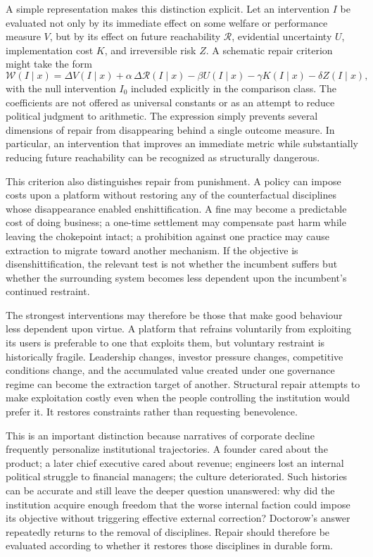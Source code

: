 \documentclass[11pt]{article}
\begin{document}
A simple representation makes this distinction explicit. Let an intervention \(I\) be evaluated not only by its immediate effect on some welfare or performance measure \(V\), but by its effect on future reachability \(\mathcal{R}\), evidential uncertainty \(U\), implementation cost \(K\), and irreversible risk \(Z\). A schematic repair criterion might take the form
\[
\mathcal{W}(I\mid x)
=
\Delta V(I\mid x)
+
\alpha\,\Delta \mathcal{R}(I\mid x)
-
\beta U(I\mid x)
-
\gamma K(I\mid x)
-
\delta Z(I\mid x),
\]
with the null intervention \(I_0\) included explicitly in the comparison class. The coefficients are not offered as universal constants or as an attempt to reduce political judgment to arithmetic. The expression simply prevents several dimensions of repair from disappearing behind a single outcome measure. In particular, an intervention that improves an immediate metric while substantially reducing future reachability can be recognized as structurally dangerous.

This criterion also distinguishes repair from punishment. A policy can impose costs upon a platform without restoring any of the counterfactual disciplines whose disappearance enabled enshittification. A fine may become a predictable cost of doing business; a one-time settlement may compensate past harm while leaving the chokepoint intact; a prohibition against one practice may cause extraction to migrate toward another mechanism. If the objective is disenshittification, the relevant test is not whether the incumbent suffers but whether the surrounding system becomes less dependent upon the incumbent's continued restraint.

The strongest interventions may therefore be those that make good behaviour less dependent upon virtue. A platform that refrains voluntarily from exploiting its users is preferable to one that exploits them, but voluntary restraint is historically fragile. Leadership changes, investor pressure changes, competitive conditions change, and the accumulated value created under one governance regime can become the extraction target of another. Structural repair attempts to make exploitation costly even when the people controlling the institution would prefer it. It restores constraints rather than requesting benevolence.

This is an important distinction because narratives of corporate decline frequently personalize institutional trajectories. A founder cared about the product; a later chief executive cared about revenue; engineers lost an internal political struggle to financial managers; the culture deteriorated. Such histories can be accurate and still leave the deeper question unanswered: why did the institution acquire enough freedom that the worse internal faction could impose its objective without triggering effective external correction? Doctorow's answer repeatedly returns to the removal of disciplines. Repair should therefore be evaluated according to whether it restores those disciplines in durable form.
\end{document}
